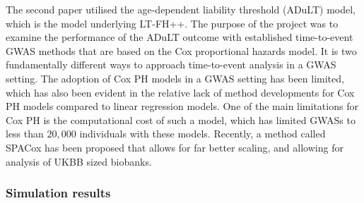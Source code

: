 The second paper utilised the age-dependent liability threshold (ADuLT) model, which is the model underlying LT-FH++. The purpose of the project was to examine the performance of the ADuLT outcome with established time-to-event GWAS methods that are based on the Cox proportional hazards model. It is two fundamentally different ways to approach time-to-event analysis in a GWAS setting. The adoption of Cox PH models in a GWAS setting has been limited, which has also been evident in the relative lack of method developments for Cox PH models compared to linear regression models. One of the main limitations for Cox PH is the computational cost of such a model, which has limited GWASs to less than $ 20,000 $ individuals with these models. Recently, a method called SPACox \cite{bi2020fast} has been proposed that allows for far better scaling, and allowing for analysis of UKBB sized biobanks. 


\subsubsection{Simulation results}


